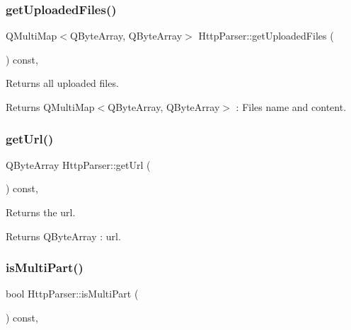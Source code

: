 \subsubsection{\texorpdfstring{get\+Uploaded\+Files()}{getUploadedFiles()}}
{\footnotesize\ttfamily Q\+Multi\+Map$<$Q\+Byte\+Array, Q\+Byte\+Array$>$ Http\+Parser\+::get\+Uploaded\+Files (\begin{DoxyParamCaption}{ }\end{DoxyParamCaption}) const\hspace{0.3cm}{\ttfamily [inline]}, {\ttfamily [noexcept]}}



Returns all uploaded files. 

\begin{DoxyReturn}{Returns}
Q\+Multi\+Map$<$\+Q\+Byte\+Array, Q\+Byte\+Array$>$ \+: Files name and content. 
\end{DoxyReturn}
\mbox{\label{class_http_parser_a4fe7e2b589ec377ae0632d12c0db2109}} 
\subsubsection{\texorpdfstring{get\+Url()}{getUrl()}}
{\footnotesize\ttfamily Q\+Byte\+Array Http\+Parser\+::get\+Url (\begin{DoxyParamCaption}{ }\end{DoxyParamCaption}) const\hspace{0.3cm}{\ttfamily [inline]}, {\ttfamily [noexcept]}}



Returns the url. 

\begin{DoxyReturn}{Returns}
Q\+Byte\+Array \+: url. 
\end{DoxyReturn}
\mbox{\label{class_http_parser_a83946a3296e540751e5715d974dc12b1}} 
\subsubsection{\texorpdfstring{is\+Multi\+Part()}{isMultiPart()}}
{\footnotesize\ttfamily bool Http\+Parser\+::is\+Multi\+Part (\begin{DoxyParamCaption}{ }\end{DoxyParamCaption}) const\hspace{0.3cm}{\ttfamily [inline]}, {\ttfamily [noexcept]}}



